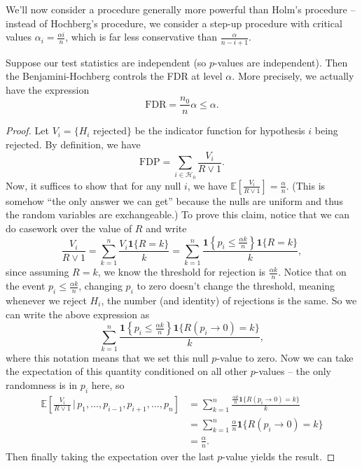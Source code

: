 We'll now consider a procedure generally more powerful than Holm's procedure -- instead of Hochberg's procedure, we consider a step-up procedure with critical values $\alpha_i = \frac{\alpha i}{n}$, which is far less conservative than $\frac{\alpha}{n - i + 1}$.

\begin{thm}
Suppose our test statistics are independent (so $p$-values are independent). Then the Benjamini-Hochberg controls the FDR at level $\alpha$. More precisely, we actually have the expression
\[
\mathrm{FDR} = \frac{n_0}{n}\alpha \leq \alpha.
\]
\end{thm}

\begin{proof}
Let $V_i = \{H_i \text{ rejected}\}$ be the indicator function for hypothesis $i$ being rejected. By definition, we have
\[
\mathrm{FDP} = \sum_{i \in \mathcal{H}_0} \frac{V_i}{R \vee 1}.
\]
Now, it suffices to show that for any null $i$, we have $\mathbb{E}\left[\frac{V_i}{R \vee 1}\right] = \frac{\alpha}{n}$. (This is somehow ``the only answer we can get'' because the nulls are uniform and thus the random variables are exchangeable.) To prove this claim, notice that we can do casework over the value of $R$ and write
\[
\frac{V_i}{R \vee 1} = \sum_{k=1}^{n} \frac{V_i \mathbf{1}\{R = k\}}{k} = \sum_{k=1}^{n} \frac{\mathbf{1}\left\{p_i \leq \frac{\alpha k}{n}\right\} \mathbf{1}\{R = k\}}{k},
\]
since assuming $R = k$, we know the threshold for rejection is $\frac{\alpha k}{n}$. Notice that on the event $p_i \leq \frac{\alpha k}{n}$, changing $p_i$ to zero doesn't change the threshold, meaning whenever we reject $H_i$, the number (and identity) of rejections is the same. So we can write the above expression as
\[
\sum_{k=1}^{n} \frac{\mathbf{1}\left\{p_i \leq \frac{\alpha k}{n}\right\} \mathbf{1}\{R(p_i \to 0) = k\}}{k},
\]
where this notation means that we set this null $p$-value to zero. Now we can take the expectation of this quantity conditioned on all other $p$-values -- the only randomness is in $p_i$ here, so
\begin{align*}
\mathbb{E}\left[\frac{V_i}{R \vee 1} \,\bigg|\, p_1, \ldots, p_{i-1}, p_{i+1}, \ldots, p_n\right] 
&= \sum_{k=1}^{n} \frac{\frac{\alpha k}{n} \mathbf{1}\{R(p_i \to 0) = k\}}{k} \\
&= \sum_{k=1}^{n} \frac{\alpha}{n} \mathbf{1}\{R(p_i \to 0) = k\} \\
&= \frac{\alpha}{n}.
\end{align*}
Then finally taking the expectation over the last $p$-value yields the result.
\end{proof}


